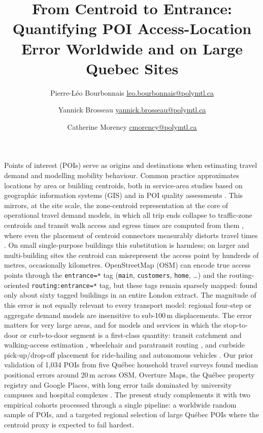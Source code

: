 \documentclass{osmscience}
\title{From Centroid to Entrance: Quantifying POI Access-Location Error Worldwide and on Large Quebec Sites}
\author[1,*]{Pierre-Léo Bourbonnais \href{mailto:leo.bourbonnais@polymtl.ca}{\underline{leo.bourbonnais@polymtl.ca}}}
\author[1]{Yannick Brosseau \href{mailto:yannick.brosseau@polymtl.ca}{\underline{yannick.brosseau@polymtl.ca}}}
\author[1]{Catherine Morency \href{mailto:cmorency@polymtl.ca}{\underline{cmorency@polymtl.ca}}}
\affil[1]{
    Polytechnique Montréal, Montréal, Canada\\
}
\date{}
\begin{document}
\maketitle

Points of interest (POIs) serve as origins and destinations when estimating travel demand and modelling mobility behaviour. Common practice approximates locations by area or building centroids, both in service-area studies based on geographic information systems (GIS) and in POI quality assessments \cite{Gutierrez2008, Biba2010, Klinkhardt2023}. This mirrors, at the site scale, the zone-centroid representation at the core of operational travel demand models, in which all trip ends collapse to traffic-zone centroids and transit walk access and egress times are computed from them \cite{Miller2021}, where even the placement of centroid connectors measurably distorts travel times \cite{Qian2012}. On small single-purpose buildings this substitution is harmless; on larger and multi-building sites the centroid can misrepresent the access point by hundreds of metres, occasionally kilometres. OpenStreetMap (OSM) can encode true access points through the \texttt{entrance=*} tag (\texttt{main}, \texttt{customers}, \texttt{home}, \ldots) and the routing-oriented \texttt{routing:entrance=*} tag, but these tags remain sparsely mapped: \cite{Hu2021} found only about sixty tagged buildings in an entire London extract. The magnitude of this error is not equally relevant to every transport model: regional four-step or aggregate demand models are insensitive to sub-100\,m displacements. The error matters for very large areas, and for models and services in which the stop-to-door or curb-to-door segment is a first-class quantity: transit catchment and walking-access estimation \cite{Gutierrez2008, ElGeneidy2014}, wheelchair and paratransit routing \cite{Neis2014}, and curbside pick-up/drop-off placement for ride-hailing and autonomous vehicles \cite{Hunter2024, Wang2025}. Our prior validation of 1{,}034 POIs from five Québec household travel surveys found median positional errors around 20\,m across OSM, Overture Maps, the Québec property registry and Google Places, with long error tails dominated by university campuses and hospital complexes \cite{Bourbonnais2026}. The present study complements it with two empirical cohorts processed through a single pipeline: a worldwide random sample of POIs, and a targeted regional selection of large Québec POIs where the centroid proxy is expected to fail hardest.
\end{document}
